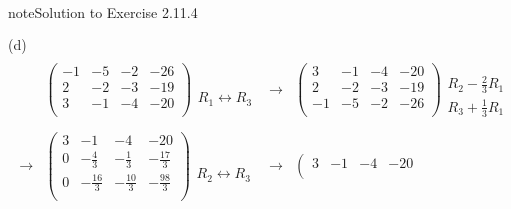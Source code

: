 \documentclass[letterpaper,10pt,english]{jupyterBook}
\begin{document}
\begin{sphinxadmonition}{note}{Solution to Exercise 2.11.4}
\begin{equation*}
\begin{split}
\begin{align*}
\end{align*} \end{split}
\end{equation*}
\sphinxAtStartPar
(d)
\begin{equation*}
\begin{split} \begin{align*} 
    & \left( \begin{array}{ccc|c} 
         -1 & -5 & -2 & -26 \\ 
         2 & -2 & -3 & -19 \\ 
         3 & -1 & -4 & -20 \\ 
    \end{array} \right) 
    \begin{array}{l} \phantom{x} \\ \phantom{x} \\ R_{1} \leftrightarrow R_{3} \\ \end{array} & 
    \longrightarrow 
    & \left( \begin{array}{ccc|c} 
         3 & -1 & -4 & -20 \\ 
         2 & -2 & -3 & -19 \\ 
         -1 & -5 & -2 & -26 \\ 
    \end{array} \right) 
    \begin{array}{l} \phantom{x} \\ R_{2} - \frac{2}{3} R_{1} \\ R_{3} + \frac{1}{3} R_{1}\end{array} \\ \\ 
    \longrightarrow 
    & \left( \begin{array}{ccc|c} 
         3 & -1 & -4 & -20 \\ 
         0 & - \frac{4}{3} & - \frac{1}{3} & - \frac{17}{3} \\ 
         0 & - \frac{16}{3} & - \frac{10}{3} & - \frac{98}{3} \\ 
    \end{array} \right) 
    \begin{array}{l} \phantom{x} \\ \phantom{x} \\ R_{2} \leftrightarrow R_{3} \\ \end{array} & 
    \longrightarrow 
    & \left( \begin{array}{ccc|c} 
         3 & -1 & -4 & -20 \\ 

\end{array}
\end{align*}
\end{split}
\end{equation*}
\end{sphinxadmonition}
\end{document}
